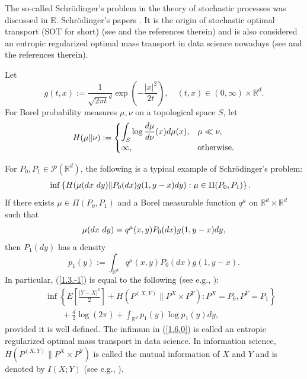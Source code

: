 \documentclass[12pt]{article}
\begin{document}
The so-called Schr\"odinger's problem in the theory of stochastic processes 
was discussed in E. Schr\"odinger's papers \cite{S1, S2}.
It is the origin of stochastic optimal transport (SOT for short) (see \cite{M2021} and the references therein) and 
is also considered an entropic regularized optimal mass transport  in data science
nowadays (see \cite{1-PC} and the references therein).

Let
$$g(t,x):=\frac{1}{\sqrt{2\pi t}^d}\exp \left( -\frac{|x|^2}{2t}\right),\quad (t, x)\in (0,\infty )\times \mathbb{R}^d.$$
For Borel probability measures $\mu,\nu$ on a topological space $S$, let 
$$H(\mu\|\nu):=
\begin{cases}
\displaystyle \int_S \log\frac{d\mu}{d\nu}(x)d\mu (x),&\mu\ll\nu,\\
\infty, &\hbox{otherwise.}
\end{cases}
$$

For $P_0,P_1\in \mathcal{P}(\mathbb{R}^d)$, the following is a typical example of Schr\"odinger's problem:
\begin{eqnarray}\label{1.3.-1}
&\inf\left\{H(\mu(dx\hbox{ }dy)\|P_0(dx)g(1,y-x)dy):\mu\in \Pi(P_0,P_1)\right\}.
\end{eqnarray}
If there exists $\mu\in \Pi(P_0,P_1)$ and a Borel measurable function $q^\mu$ on  
$\mathbb{R}^d\times \mathbb{R}^d$ such that 
$$\mu (dx\hbox{ }dy)=q^\mu(x,y)P_0(dx)g(1,y-x)dy,$$
then $P_1(dy)$ has a density
$$p_1(y):=\int_{\mathbb{R}^d}q^\mu(x,y)P_0(dx)g(1,y-x).$$
In particular, (\ref{1.3.-1}) is equal to the following (see e.g., \cite{1-PC}):
\begin{eqnarray}
&&\inf\left\{E\left[\frac{|Y-X|^2}{2}\right]+H(P^{(X,Y)}\|P^{X}\times P^{Y}):
P^X=P_0, P^Y=P_1\right\}\label{1.6.0}\\
&&\qquad +\frac{d}{2}\log (2\pi )+\int_{\mathbb{R}^d}p_1(y)\log p_1(y)dy,\nonumber
\end{eqnarray} 
provided it is well defined.
The infimum in (\ref{1.6.0}) is called an entropic regularized optimal mass transport  in data science.
In information science, $H(P^{(X,Y)}\|P^{X}\times P^{Y})$
is called the mutual information of $X$ and $Y$ and is denoted by $I(X;Y)$ (see e.g., \cite{Cover}).
\end{document}
